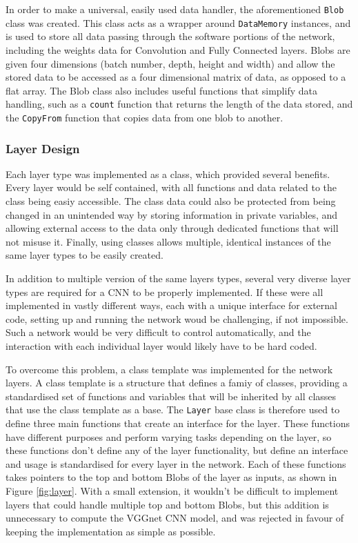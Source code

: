 \documentclass[12pt]{article}
\begin{document}
In order to make a universal, easily used data handler, the aforementioned \lstinline|Blob| class was created. This class acts as a wrapper around \lstinline|DataMemory| instances, and is used to store all data passing through the software portions of the network, including the weights data for Convolution and Fully Connected layers. Blobs are given four dimensions (batch number, depth, height and width) and allow the stored data to be accessed as a four dimensional matrix of data, as opposed to a flat array. The Blob class also includes useful functions that simplify data handling, such as a \lstinline|count| function that returns the length of the data stored, and the \lstinline|CopyFrom| function that copies data from one blob to another.

\subsubsection{Layer Design}
\label{sec:Design-Network-Layers}

Each layer type was implemented as a class, which provided several benefits. Every layer would be self contained, with all functions and data related to the class being easiy accessible. The class data could also be protected from being changed in an unintended way by storing information in private variables, and allowing external access to the data only through dedicated functions that will not misuse it. Finally, using classes allows multiple, identical instances of the same layer types to be easily created.

In addition to multiple version of the same layers types, several very diverse layer types are required for a CNN to be properly implemented. If these were all implemented in vastly different ways, each with a unique interface for external code, setting up and running the network woud be challenging, if not impossible. Such a network would be very difficult to control automatically, and the interaction with each individual layer would likely have to be hard coded. 

To overcome this problem, a class template was implemented for the network layers. A class template is a structure that defines a famiy of classes, providing a standardised set of functions and variables that will be inherited by all classes that use the class template as a base. The \lstinline|Layer| base class is therefore used to define three main functions that create an interface for the layer. These functions have different purposes and perform varying tasks depending on the layer, so these functions don't define any of the layer functionality, but define an interface and usage is standardised for every layer in the network. Each of these functions takes pointers to the top and bottom Blobs of the layer as inputs, as shown in Figure \ref{fig:layer}. With a small extension, it wouldn't be difficult to implement layers that could handle multiple top and bottom Blobs, but this addition is unnecessary to compute the VGGnet CNN model, and was rejected in favour of keeping the implementation as simple as possible.
\end{document}
